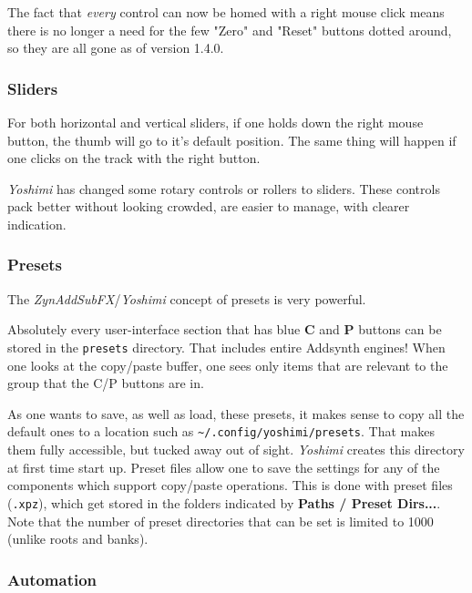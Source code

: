    The fact that \textsl{every} control can now be homed with a right mouse
   click means there is no longer a need for the few "Zero" and "Reset" buttons
   dotted around, so they are all gone as of version 1.4.0.

\subsubsection{Sliders}
\label{subsubsec:stock_settings_elements_sliders}

   For both horizontal and vertical sliders, if one holds down the right mouse
   button, the thumb will go to it's default position.  The same thing will
   happen if one clicks on the track with the right button.

   \textsl{Yoshimi} has changed some rotary controls or rollers to sliders.
   These controls pack better without looking crowded, are easier to manage,
   with clearer indication.

\subsubsection{Presets}
\label{subsubsec:stock_settings_elements_presets}

   The \textsl{ZynAddSubFX}/\textsl{Yoshimi} concept of presets is very
   powerful.

   Absolutely every user-interface section that has blue \textbf{C}
   and \textbf{P} buttons can be
   stored in the \texttt{presets} directory. That includes entire Addsynth
   engines! When one looks at the copy/paste buffer, one sees only items that
   are relevant to the group that the C/P buttons are in.

   As one wants to save, as well as load, these presets, it makes sense to copy
   all the default ones to a location such as
   \texttt{\textasciitilde/.config/yoshimi/presets}.
   That makes them fully accessible, but
   tucked away out of sight.  \textsl{Yoshimi} creates this directory at first
   time start up.
   Preset files allow one to save the
   settings for any of the components which support copy/paste operations.
   This is done with preset files (\texttt{.xpz}), which get stored in the
   folders indicated by \textbf{Paths / Preset Dirs...}.
   Note that the number of preset directories that can be set is limited to 1000 (unlike roots and banks).

\subsubsection{Automation}
\label{subsubsec:stock_settings_elements_automation}

